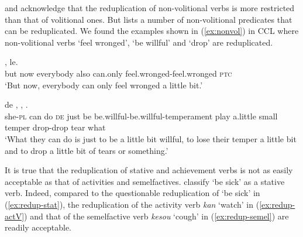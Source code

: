 \citet[53]{Chen2001} and \citet[10--11]{Yang2003} acknowledge that the reduplication of non\hyp{}vo\-li\-tion\-al verbs is more restricted than that of volitional ones.
But \citet[381--382]{Zhu1998} lists a number of non\hyp{}volitional predicates that can be reduplicated.
We found the examples shown in (\ref{ex:nonvol}) in {CCL} where non\nobreakdash-vo\-li\-tion\-al verbs  `feel wronged',  `be willful' and  `drop' are reduplicated.

\settowidth{}

\begin{sloppypar}
\ea\label{ex:nonvol}
\ea
\gll {} ,     le.\\
but now  everybody also can.only feel.wronged-feel.wronged \textsc{ptc}\\ 
\glt `But now, everybody can only feel wronged a little bit.'

\ex
\gll {}   de   ,    ,   .\\
she-\textsc{pl} can do \textsc{de} just be be.willful-be.willful-temperament play a.little small temper drop-drop tear what \\ 
\glt `What they can do is just to be a little bit willful, to lose their temper a little bit and to drop a little bit of tears or something.'
\z
\z
\end{sloppypar}

It is true that  the reduplication of stative and achievement verbs is not as easily acceptable as that of activities and semelfactives.
\citep[155]{XiaoMcEnery2004} classify  `be sick' as a stative verb.
Indeed, compared  to the questionable reduplication of  `be sick' in (\ref{ex:redup-stat}),  
 the reduplication of the activity verb \textit{kan} `watch' in (\ref{ex:redup-actV})
and that of the semelfactive verb \textit{kesou} `cough' in (\ref{ex:redup-semel}) are readily acceptable.

\settowidth{}

\ea
{}\label{ex:redup-stat}

